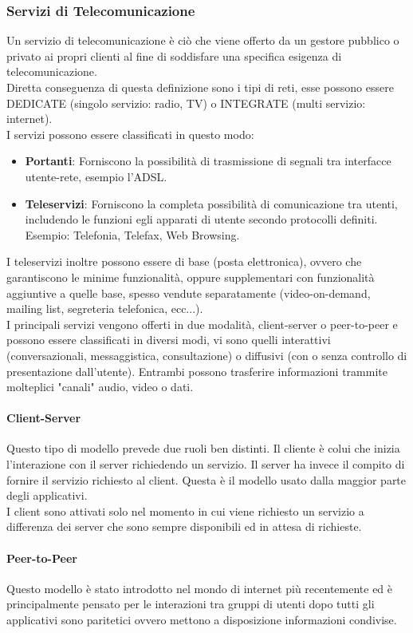 \documentclass[12pt]{article}
\begin{document}
\subsubsection{Servizi di Telecomunicazione}
Un servizio di telecomunicazione è ciò che viene offerto da un gestore pubblico o privato ai propri clienti al fine di soddisfare una specifica esigenza di telecomunicazione.\\
Diretta conseguenza di questa definizione sono i tipi di reti, esse possono essere DEDICATE (singolo servizio: radio, TV) o INTEGRATE (multi servizio: internet).\\
I servizi possono essere classificati in questo modo:
\begin{itemize}
  \item \textbf{Portanti}: Forniscono la possibilità di trasmissione di segnali tra interfacce utente-rete, esempio l'ADSL.
  \item \textbf{Teleservizi}: Forniscono la completa possibilità di comunicazione tra utenti, includendo le funzioni egli apparati di utente secondo protocolli definiti. Esempio: Telefonia, Telefax, Web Browsing.
\end{itemize}
I teleservizi inoltre possono essere di base (posta elettronica), ovvero che garantiscono le minime funzionalità, oppure supplementari con funzionalità aggiuntive a quelle base, spesso vendute separatamente (video-on-demand, mailing list, segreteria telefonica, ecc...).\\
I principali servizi vengono offerti in due modalità, client-server o peer-to-peer e possono essere classificati in diversi modi, vi sono quelli interattivi (conversazionali, messaggistica, consultazione) o diffusivi (con o senza controllo di presentazione dall'utente). Entrambi possono trasferire informazioni trammite molteplici "canali" audio, video o dati.
\paragraph{Client-Server}
Questo tipo di modello prevede due ruoli ben distinti. Il cliente è colui che inizia l'interazione con il server richiedendo un servizio. Il server ha invece il compito di fornire il servizio richiesto al client. Questa è il modello usato dalla maggior parte degli applicativi.\\
I client sono attivati solo nel momento in cui viene richiesto un servizio a differenza dei server che sono sempre disponibili ed in attesa di richieste.
\paragraph{Peer-to-Peer}
Questo modello è stato introdotto nel mondo di internet più recentemente ed è principalmente pensato per le interazioni tra gruppi di utenti dopo tutti gli applicativi sono paritetici ovvero mettono a disposizione informazioni condivise.
\end{document}
